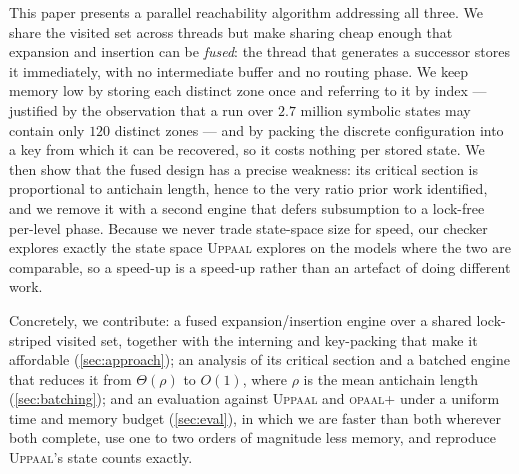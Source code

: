This paper presents a parallel reachability algorithm addressing all three. We share the
visited set across threads but make sharing cheap enough that expansion and insertion can be
\emph{fused}: the thread that generates a successor stores it immediately, with no
intermediate buffer and no routing phase. We keep memory low by storing each distinct zone
once and referring to it by index --- justified by the observation that a run over $2.7$
million symbolic states may contain only $120$ distinct zones --- and by packing the discrete
configuration into a key from which it can be recovered, so it costs nothing per stored state.
We then show that the fused design has a precise weakness: its critical section is
proportional to antichain length, hence to the very ratio prior work identified, and we
remove it with a second engine that defers subsumption to a lock-free per-level phase. Because
we never trade state-space size for speed, our checker explores exactly the state space
\textsc{Uppaal} explores on the models where the two are comparable, so a speed-up is a
speed-up rather than an artefact of doing different work.

Concretely, we contribute: a fused expansion/insertion engine over a shared lock-striped
visited set, together with the interning and key-packing that make it affordable
(\cref{sec:approach}); an analysis of its critical section and a batched engine that reduces
it from $\Theta(\rho)$ to $O(1)$, where $\rho$ is the mean antichain length
(\cref{sec:batching}); and an evaluation against \textsc{Uppaal} and \textsc{opaal}+\ltsmin{}
under a uniform time and memory budget (\cref{sec:eval}), in which we are faster than both
wherever both complete, use one to two orders of magnitude less memory, and reproduce
\textsc{Uppaal}'s state counts exactly.
